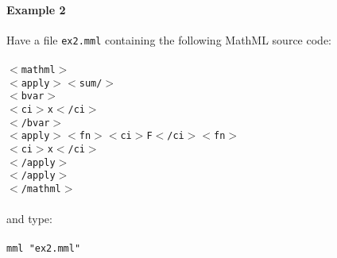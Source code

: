 \documentclass{article}
\begin{document}
\paragraph{Example 2}Have a file {\tt ex2.mml} containing the following
MathML source code:\\
\\
{\tt                 $<$mathml$>$\\
\hspace*{1mm}      $<$apply$>$$<$sum/$>$\\
\hspace*{5mm}       $<$bvar$>$\\
\hspace*{9mm}         $<$ci$>$x$<$/ci$>$\\
\hspace*{5mm}       $<$/bvar$>$\\
\hspace*{5mm}       $<$apply$>$$<$fn$>$$<$ci$>$F$<$/ci$>$$<$fn$>$\\
\hspace*{9mm}         $<$ci$>$x$<$/ci$>$\\
\hspace*{5mm}       $<$/apply$>$\\
\hspace*{1mm}      $<$/apply$>$\\
                  $<$/mathml$>$\\}
\\
and type:\\
\\
{\tt mml "ex2.mml"}
\end{document}
